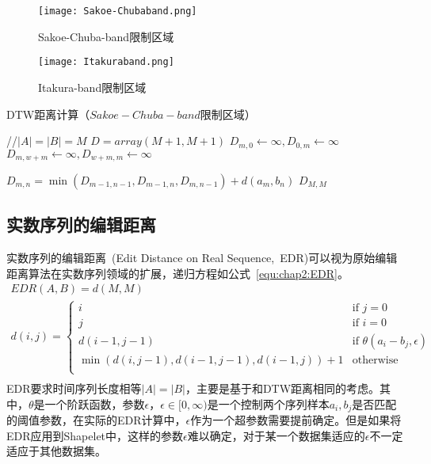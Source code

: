 \begin{figure}
	\begin{minipage}{0.48\textwidth}
		\centering
		\texttt{[image: Sakoe-Chubaband.png]}
		\caption{Sakoe-Chuba-band限制区域}
		\label{fig:Sakoe-Chuba-band}
	\end{minipage}\hfill
	\begin{minipage}{0.48\textwidth}
		\centering
		\texttt{[image: Itakuraband.png]}
		\caption{Itakura-band限制区域}
		\label{fig:Itakura-band}
	\end{minipage}
\end{figure}

\begin{breakablealgorithm}
	\caption{DTW距离计算（$Sakoe-Chuba-band$限制区域）}
	\label{alg:fastdtw}
	\begin{algorithmic}[1]
		  //$|A|=|B|=M$
			\State $D = array(M+1,M+1)$
					\State $D_{m,0} \gets \infty, D_{0,m} \gets \infty$
				\Else
					\State $D_{m,w+m} \gets \infty, D_{w+m,m} \gets \infty$
				\EndIf
			\EndFor
			
					\State $D_{m,n} = \min(D_{m-1,n-1},D_{m-1,n},D_{m,n-1}) + d(a_m,b_n)$
				\EndFor
			\EndFor
			\State \Return $D_{M,M}$
		\EndFunction
	\end{algorithmic}
\end{breakablealgorithm}

\subsection{实数序列的编辑距离}
实数序列的编辑距离~\cite{chen2005robust}(Edit Distance on Real Sequence,~EDR)可以视为原始编辑距离算法在实数序列领域的扩展，递归方程如公式~\ref{equ:chap2:EDR}。
\begin{equation}
\label{equ:chap2:EDR}
\begin{array}{l}
EDR(A,B) = d(M,M) \\ [0.3cm]
d(i,j) = \begin{cases}
i & \text{if }j=0 \\
j & \text{if } i=0 \\
d(i-1,j-1) & \text{if } \theta(a_i-b_j,\epsilon) \\
\min(d(i,j-1),d(i-1,j-1),d(i-1,j)) + 1 & \text{otherwise} \\
\end{cases}\\[0.2cm]
\end{array}
\end{equation}
EDR要求时间序列长度相等$|A|=|B|$，主要是基于和DTW距离相同的考虑。其中，$\theta$是一个阶跃函数，参数$\epsilon$，$\epsilon\in [0,\infty)$是一个控制两个序列样本$a_i,b_j$是否匹配的阈值参数，在实际的EDR计算中，$\epsilon$作为一个超参数需要提前确定。但是如果将EDR应用到Shapelet中，这样的参数$\epsilon$难以确定，对于某一个数据集适应的$\epsilon$不一定适应于其他数据集。

